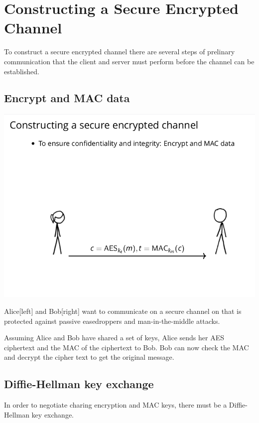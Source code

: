 \documentclass[11pt]{article} %
\begin{document}
\section{Constructing a Secure Encrypted Channel}
To construct a secure encrypted channel there are several steps of prelinary
communication that the client and server must perform before the channel can be
established.

\subsection{Encrypt and MAC data}

\includegraphics[scale=.7]{./tls1.png}

{\parindent0pt Alice[left] and Bob[right] want to communicate on a secure 
channel on that is protected against passive easedroppers and man-in-the-middle
attacks.}

\bigskip
{\parindent0pt Assuming Alice and Bob have shared a set of keys, Alice sends her
AES ciphertext and the MAC of the ciphertext to Bob.  Bob can now check the MAC
and decrypt the cipher text to get the original message.}

\newpage
\subsection{Diffie-Hellman key exchange}
In order to negotiate charing encryption and MAC keys, there must be a
Diffie-Hellman key exchange.
\end{document}

